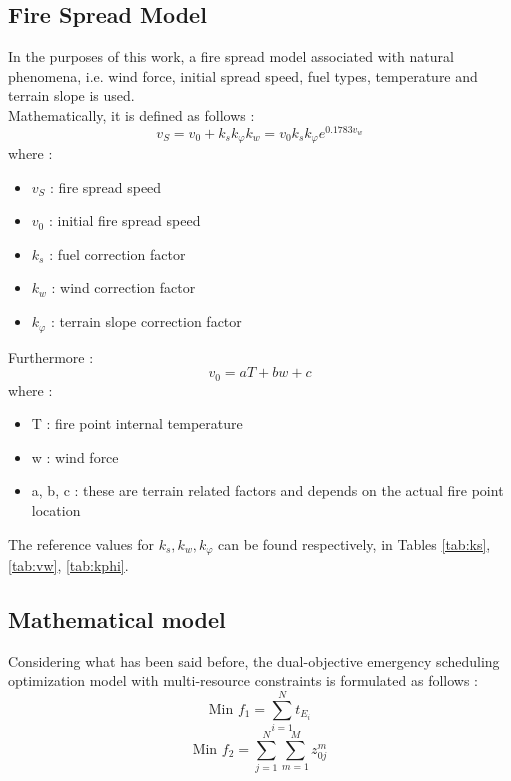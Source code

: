 \subsection{Fire Spread Model}
In the purposes of this work, a fire spread model associated with natural phenomena, i.e. wind force, initial spread speed, fuel types, temperature and terrain slope is used.\\
Mathematically, it is defined as follows :
\begin{equation}
    v_S = v_0 + k_sk_{\varphi} k_w = v_0 k_s k_{\varphi} e^{0.1783v_w}
    \label{eq:spread_speed}
\end{equation}
where :
\begin{itemize}
    \item $v_S$ : fire spread speed
    \item $v_0$ : initial fire spread speed
    \item $k_s$ : fuel correction factor
    \item $k_w$ : wind correction factor 
    \item $k_{\varphi}$ : terrain slope correction factor 
\end{itemize}
Furthermore : 
\begin{equation}
    v_0 = aT + bw + c
    \label{eq:intial_speed}
\end{equation}
where :
\begin{itemize}
    \item T : fire point internal temperature
    \item w : wind force
    \item a, b, c : these are terrain related factors and depends on the actual fire point location
\end{itemize}
The reference values for $k_s, k_w, k_{\varphi}$ can be found respectively, in Tables \ref{tab:ks}, \ref{tab:vw}, \ref{tab:kphi}.

\subsection{Mathematical model}
Considering what has been said before, the dual-objective emergency scheduling optimization model with multi-resource constraints is formulated as follows :
\begin{equation}
    \label{eqn:f1}
    \text{Min   } f_1 = \sum_{i=1}^N t_{E_i}
\end{equation}
\begin{equation}
    \label{eqn:f2}
    \text{Min   } f_2= \sum_{j=1}^N \sum_{m=1}^M z_{0j}^m
\end{equation}

